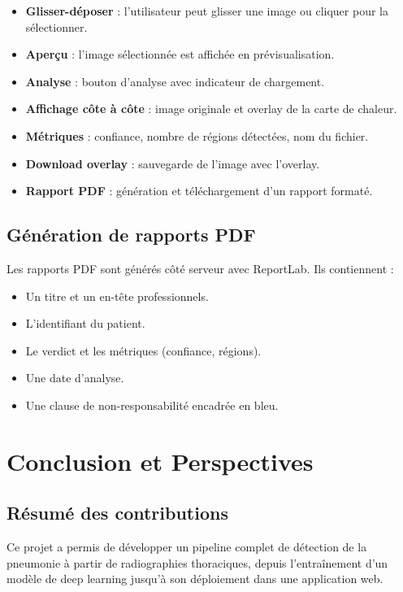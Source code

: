 \documentclass[12pt,a4paper,twoside]{report}
\begin{document}
\begin{itemize}
  \item \textbf{Glisser-déposer} : l'utilisateur peut glisser une image ou cliquer pour la sélectionner.
  \item \textbf{Aperçu} : l'image sélectionnée est affichée en prévisualisation.
  \item \textbf{Analyse} : bouton d'analyse avec indicateur de chargement.
  \item \textbf{Affichage côte à côte} : image originale et overlay de la carte de chaleur.
  \item \textbf{Métriques} : confiance, nombre de régions détectées, nom du fichier.
  \item \textbf{Download overlay} : sauvegarde de l'image avec l'overlay.
  \item \textbf{Rapport PDF} : génération et téléchargement d'un rapport formaté.
\end{itemize}

\section{Génération de rapports PDF}

Les rapports PDF sont générés côté serveur avec ReportLab. Ils contiennent :
\begin{itemize}
  \item Un titre et un en-tête professionnels.
  \item L'identifiant du patient.
  \item Le verdict et les métriques (confiance, régions).
  \item Une date d'analyse.
  \item Une clause de non-responsabilité encadrée en bleu.
\end{itemize}

\chapter{Conclusion et Perspectives}

\section{Résumé des contributions}

Ce projet a permis de développer un pipeline complet de détection de la pneumonie à partir de radiographies thoraciques, depuis l'entraînement d'un modèle de deep learning jusqu'à son déploiement dans une application web.
\end{document}
